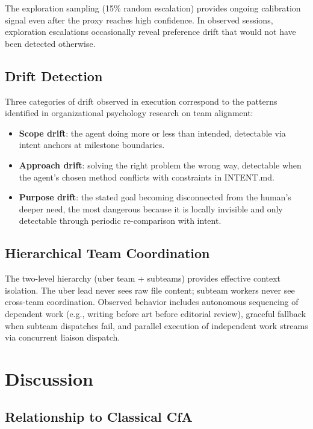 \documentclass[11pt,a4paper]{article}
\begin{document}
The exploration sampling (15\% random escalation) provides ongoing
calibration signal even after the proxy reaches high confidence.
In observed sessions, exploration escalations occasionally reveal
preference drift that would not have been detected otherwise.

\subsection{Drift Detection}

Three categories of drift observed in execution correspond to the
patterns identified in organizational psychology research on team
alignment:

\begin{itemize}
    \item \textbf{Scope drift}: the agent doing more or less than
    intended, detectable via intent anchors at milestone boundaries.
    \item \textbf{Approach drift}: solving the right problem the
    wrong way, detectable when the agent's chosen method conflicts
    with constraints in INTENT.md.
    \item \textbf{Purpose drift}: the stated goal becoming
    disconnected from the human's deeper need, the most dangerous
    because it is locally invisible and only detectable through
    periodic re-comparison with intent.
\end{itemize}

\subsection{Hierarchical Team Coordination}

The two-level hierarchy (uber team + subteams) provides effective
context isolation. The uber lead never sees raw file content; subteam
workers never see cross-team coordination. Observed behavior
includes autonomous sequencing of dependent work (e.g., writing
before art before editorial review), graceful fallback when subteam
dispatches fail, and parallel execution of independent work streams
via concurrent liaison dispatch.

\section{Discussion}
\label{sec:discussion}

\subsection{Relationship to Classical CfA}
\end{document}
